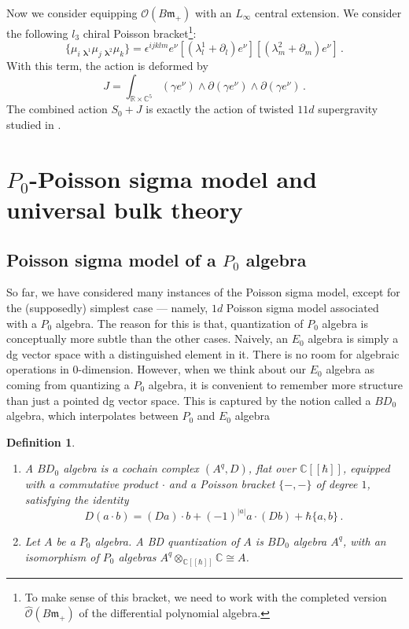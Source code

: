 \documentclass[11pt]{article}
\newcommand{\C}{\mathbb{C}}
\newcommand{\R}{\mathbb{R}}
\numberwithin{equation}{section}
\newtheorem{definition}{Definition}[section]
\begin{document}
Now we consider equipping $\mathcal{O}(B\mathfrak{m}_+)$ with an $L_\infty$ central extension. We consider the following $l_3$ chiral Poisson bracket\footnote{To make sense of this bracket, we need to work with the completed version $\hat{\mathcal{O}}(B\mathfrak{m}_+)$ of the differential polynomial algebra.}: 
\begin{equation}
	\{\mu_i~_{\boldsymbol{\lambda}^{1}}\mu_j~_{\boldsymbol{\lambda}^{2}}\mu_k\} = \epsilon^{ijklm}e^{\nu}[(\lambda^{1}_l+\partial_l)e^{\nu}][(\lambda^{2}_m + \partial_m)e^{\nu}]\,.
\end{equation}
With this term, the action is deformed by
\begin{equation} 
	J = \int_{\R\times\C^5} (\gamma e^{\nu})\wedge\partial(\gamma e^{\nu})\wedge \partial(\gamma e^{\nu})\,.
\end{equation}
The combined action $S_0 + J$ is exactly the action of twisted $11d$ supergravity studied in \cite{raghavendran2023twisted}.



\section{$P_0$-Poisson sigma model and universal bulk theory}
\label{sec:P0_PSM}
\subsection{Poisson sigma model of a $P_0$ algebra}
So far, we have considered many instances of the Poisson sigma model, except for the (supposedly) simplest case — namely, $1d$ Poisson sigma model associated with a $P_0$ algebra. The reason for this is that, quantization of $P_0$ algebra is conceptually more subtle than the other cases. Naively, an $E_0$ algebra is simply a dg vector space with a distinguished element in it. There is no room for algebraic operations in $0$-dimension. However, when we think about our $E_0$ algebra as coming from quantizing a $P_0$ algebra, it is convenient to remember more structure than just a pointed dg vector space. This is captured by the notion called a $BD_0$ algebra, which interpolates between $P_0$ and $E_0$ algebra
\begin{definition}
\begin{enumerate}
	\item A $BD_0$ algebra is a cochain complex $(A^q,D)$, flat over $\C[[\hbar]]$, equipped with a commutative product $\cdot$ and a Poisson bracket $\{-,-\}$ of degree $1$, satisfying the identity
	\begin{equation}
		D(a\cdot b) =  (D a)\cdot b +  (-1)^{|a|}a\cdot (D b) + \hbar\{a,b\}\,.
	\end{equation}
	\item Let $A$ be a $P_0$ algebra. A BD quantization of $A$ is $BD_0$ algebra $A^{q}$, with an isomorphism of $P_0$ algebras $A^q \otimes_{\C[[\hbar]]} \C \cong A$.
\end{enumerate}
\end{definition}
\end{document}
